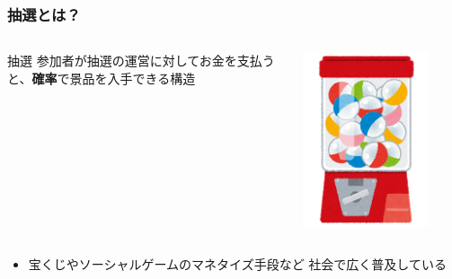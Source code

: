\begin{frame}
  \frametitle{抽選とは？}

  \pause
  \begin{columns}
    \begin{column}{0.9\textwidth}
      \begin{block}{抽選}
        参加者が抽選の運営に対してお金を支払うと、\textbf{確率}で景品を入手できる構造
      \end{block}
    \end{column}
    \begin{column}{0.1\textwidth}
      \begin{center}
        \includegraphics[width=0.8\textwidth]{img/gachagacha.png}
      \end{center}
    \end{column}
  \end{columns}

  \pause
  \begin{itemize}
    \item 宝くじやソーシャルゲームのマネタイズ手段など
    社会で広く普及している
  \end{itemize}
  

\end{frame}
